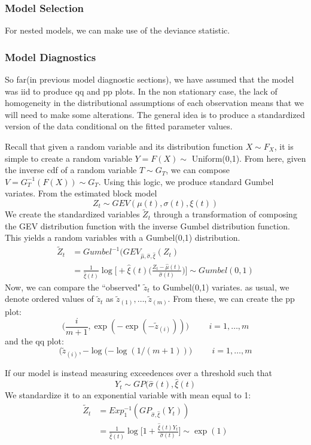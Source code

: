 \documentclass{article}
\theoremstyle{definition}
\theoremstyle{definition}
\begin{document}
\subsubsection{Model Selection}
For nested models, we can make use of the deviance statistic.

\subsubsection{Model Diagnostics}
So far(in previous model diagnostic sections), we have assumed that the model was iid to produce qq and pp plots. In the non stationary case, the lack of homogeneity in the distributional assumptions of each observation means that we will need to make some alterations. The general idea is to produce a standardized version of the data conditional on the fitted parameter values. 

Recall that given a random variable and its distribution function $X\sim F_X$, it is simple to create a random variable $Y=F(X)\sim$ Uniform(0,1). From here, given the inverse cdf of a random variable $T \sim G_T$, we can compose $V=G_T^{-1}(F(X))\sim G_T$. Using this logic, we produce standard Gumbel variates. From the estimated block model  
\[Z_t \sim GEV(\mu(t), \sigma(t), \xi(t))\]
We create the standardized variables $\tilde{Z}_t$ through a transformation of composing the GEV distribution function with the inverse Gumbel distribution function. This yields a random variables with a Gumbel(0,1) distribution.
\begin{align*}
    \tilde{Z}_t&= Gumbel^{-1}(GEV_{\hat\mu,\hat\sigma,\hat\xi}(Z_t)\\
    &= \frac{1}{\hat\xi(t)}\log\bigg[ +\hat\xi(t)\bigg( \frac{Z_t-\hat\mu(t)}{\hat\sigma(t)}\bigg) \bigg]\sim Gumbel(0,1)
\end{align*}
Now, we can compare the ``observed" $\tilde{z}_t$ to Gumbel(0,1) variates. as usual, we denote ordered values of $\tilde{z}_t$ as $\tilde{z}_{(1)},\hdots, \tilde{z}_{(m)}$. From these, we can create the pp plot:
\[\bigg(\frac{i}{m+1},\exp(-\exp(-\tilde{z}_{(i)}))\bigg) \hspace{1cm} i=1,\hdots,m\]
and the qq plot:
\[\bigg(\tilde{z}_{(i)}, -\log(-\log(1/(m+1))\bigg)\hspace{1cm} i=1,\hdots,m\]

If our model is instead measuring exceedences over a threshold such that
\[Y_t\sim GP(\hat\sigma(t),\hat\xi(t)\]
We standardize it to an exponential variable with
mean equal to 1:
\begin{align*}
    \tilde{Z}_t&= Exp^{-1}_1(GP_{\hat\sigma, \hat\xi}(Y_t))\\
    &=\frac{1}{\hat\xi(t)}\log\bigg[1 +\frac{\hat\xi(t)Y_t}{\hat\sigma(t)} \bigg] \sim \exp(1)
\end{align*}
\end{document}
